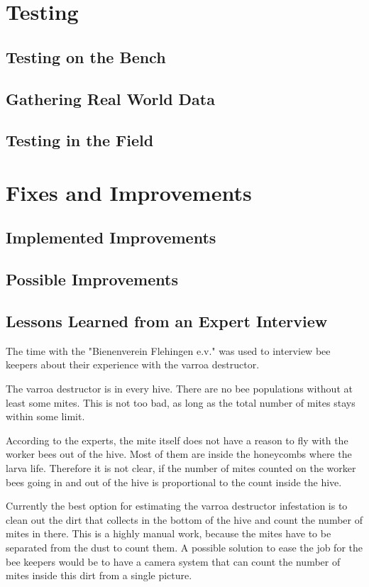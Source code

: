 \documentclass[a4paper,titlepage]{article}
\begin{document}
\newpage
\section{Testing}
\subsection{Testing on the Bench}
\subsection{Gathering Real World Data}
\subsection{Testing in the Field}

\newpage
\section{Fixes and Improvements}
\subsection{Implemented Improvements}
\subsection{Possible Improvements}
\subsection{Lessons Learned from an Expert Interview}

The time with the "Bienenverein Flehingen e.v." was used to interview bee keepers about their experience with the varroa destructor.

The varroa destructor is in every hive.
There are no bee populations without at least some mites.
This is not too bad, as long as the total number of mites stays within some limit.

According to the experts, the mite itself does not have a reason to fly with the worker bees out of the hive.
Most of them are inside the honeycombs where the larva life.
Therefore it is not clear, if the number of mites counted on the worker bees going in and out of the hive is proportional to the count inside the hive.

Currently the best option for estimating the varroa destructor infestation is to clean out the dirt that collects in the bottom of the hive and count the number of mites in there.
This is a highly manual work, because the mites have to be separated from the dust to count them.
A possible solution to ease the job for the bee keepers would be to have a camera system that can count the number of mites inside this dirt from a single picture.
\end{document}

